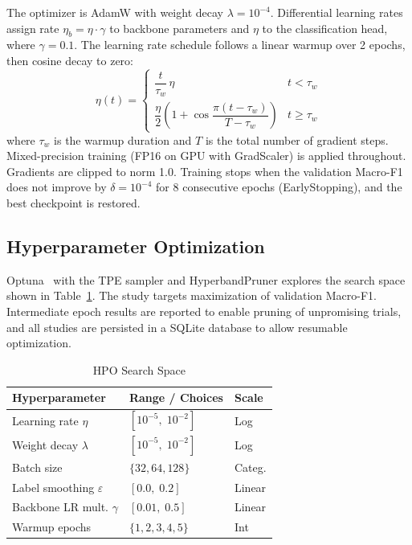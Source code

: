 \documentclass[conference]{IEEEtran}
\begin{document}
The optimizer is AdamW with weight decay $\lambda = 10^{-4}$. Differential
learning rates assign rate $\eta_b = \eta \cdot \gamma$ to backbone
parameters and $\eta$ to the classification head, where $\gamma = 0.1$.
The learning rate schedule follows a linear warmup over 2 epochs, then
cosine decay to zero:
\begin{equation}
  \eta(t) =
  \begin{cases}
    \dfrac{t}{\tau_w}\,\eta & t < \tau_w \\[6pt]
    \dfrac{\eta}{2}\!\left(1 + \cos\dfrac{\pi(t-\tau_w)}{T-\tau_w}\right) & t \geq \tau_w
  \end{cases}
  \label{eq:schedule}
\end{equation}
where $\tau_w$ is the warmup duration and $T$ is the total number of
gradient steps. Mixed-precision training (FP16 on GPU with GradScaler) is
applied throughout. Gradients are clipped to norm 1.0. Training stops when
the validation Macro-F1 does not improve by $\delta = 10^{-4}$ for 8
consecutive epochs (EarlyStopping), and the best checkpoint is restored.

\subsection{Hyperparameter Optimization}

Optuna~\cite{akiba2019} with the TPE sampler and HyperbandPruner explores
the search space shown in Table~\ref{tab:hpo}. The study targets
maximization of validation Macro-F1. Intermediate epoch results are reported
to enable pruning of unpromising trials, and all studies are persisted in a
SQLite database to allow resumable optimization.

\begin{table}[htbp]
  \centering
  \caption{HPO Search Space}
  \label{tab:hpo}
  \begin{tabular}{lll}
    \toprule
    \textbf{Hyperparameter} & \textbf{Range / Choices} & \textbf{Scale} \\
    \midrule
    Learning rate $\eta$        & $[10^{-5},\;10^{-2}]$   & Log     \\
    Weight decay $\lambda$      & $[10^{-5},\;10^{-2}]$   & Log     \\
    Batch size                  & $\{32, 64, 128\}$        & Categ.  \\
    Label smoothing $\varepsilon$ & $[0.0,\;0.2]$          & Linear  \\
    Backbone LR mult. $\gamma$  & $[0.01,\;0.5]$           & Linear  \\
    Warmup epochs               & $\{1, 2, 3, 4, 5\}$      & Int     \\
    \bottomrule
  \end{tabular}
\end{table}
\end{document}
